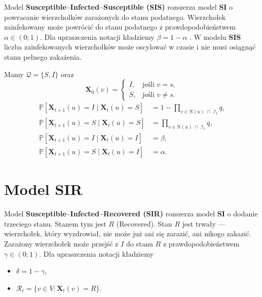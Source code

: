 Model \textbf{Susceptible--Infected--Susceptible (SIS)} rozszerza model \textbf{SI} o powracanie wierzchołków zarażonych do stanu podatnego. Wierzchołek zainfekowany może powrócić do stanu podatnego z prawdopodobieństwem $\alpha \in (0;1)$. Dla upraszczenia notacji kładziemy $\beta=1-\alpha $ .
W modelu \textbf{SIS} liczba zainfekowanych wierzchołków może oscylować w czasie i nie musi osiągnąć stanu pełnego zakażenia.

Mamy $\mathcal{Q} = \{S, I\}$ oraz
\[
\mathbf{X}_0(v) =
\begin{cases}
I, & \text{jeśli } v = s, \\[4pt]
S, & \text{jeśli } v \neq s.
\end{cases}
\]
\[
\begin{aligned}
\mathbb{P}[\mathbf{X}_{t+1}(u) = I \mid \mathbf{X}_t(u) = S]
 &= 1 - \prod_{v \in \mathrm{N}(u) \;\cap\; \mathcal{I}_t} q, \\[6pt]
\mathbb{P}[\mathbf{X}_{t+1}(u) = S \mid \mathbf{X}_t(u) = S]
 &= \prod_{v \in \mathrm{N}(u) \;\cap\; \mathcal{I}_t} q, \\[6pt]
\mathbb{P}[\mathbf{X}_{t+1}(u) = I \mid \mathbf{X}_t(u) = I]
 &= \beta, \\[6pt]
\mathbb{P}[\mathbf{X}_{t+1}(u) = S \mid \mathbf{X}_t(u) = I]
 &= \alpha.
\end{aligned}
\]


\section{Model SIR}

Model \textbf{Susceptible--Infected--Recovered (SIR)} rozszerza model \textbf{SI} o dodanie trzeciego stanu. Stanem tym jest $R$ (Recovered). 
Stan $R$ jest trwały — wierzchołek, który wyzdrowiał, nie może już ani się zarazić, ani nikogo zakazić. Zarażony wierzchołek może przejść z $I$ do stanu $R$ z prawdopodobieństwem $\gamma \in (0;1)$. Dla upraszczenia notacji kładziemy 
\begin{itemize}
    \item $\delta=1-\gamma$,
    \item $\mathcal{R}_t=\{v\in V: \mathbf{X}_t(v) = R\}$.
\end{itemize}
   
